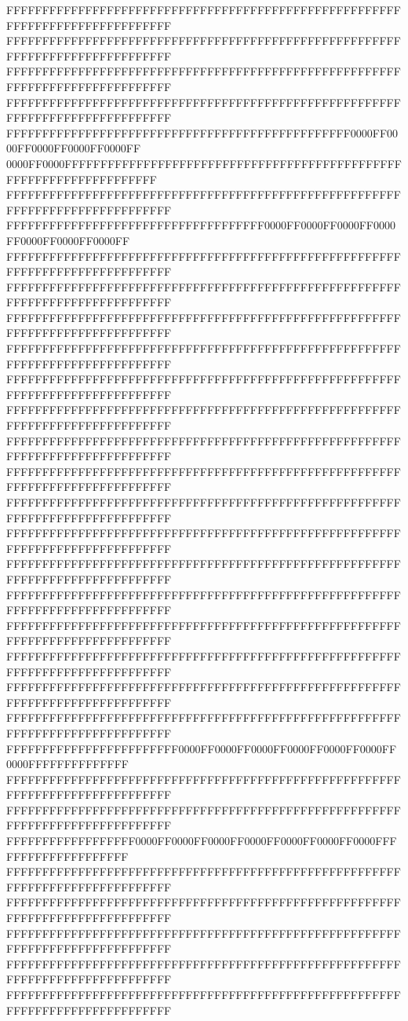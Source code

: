 FFFFFFFFFFFFFFFFFFFFFFFFFFFFFFFFFFFFFFFFFFFFFFFFFFFFFFFFFFFFFFFFFFFFFFFFFFFFFF
FFFFFFFFFFFFFFFFFFFFFFFFFFFFFFFFFFFFFFFFFFFFFFFFFFFFFFFFFFFFFFFFFFFFFFFFFFFFFF
FFFFFFFFFFFFFFFFFFFFFFFFFFFFFFFFFFFFFFFFFFFFFFFFFFFFFFFFFFFFFFFFFFFFFFFFFFFFFF
FFFFFFFFFFFFFFFFFFFFFFFFFFFFFFFFFFFFFFFFFFFFFFFFFFFFFFFFFFFFFFFFFFFFFFFFFFFFFF
FFFFFFFFFFFFFFFFFFFFFFFFFFFFFFFFFFFFFFFFFFFFFFFF0000FF0000FF0000FF0000FF0000FF
0000FF0000FFFFFFFFFFFFFFFFFFFFFFFFFFFFFFFFFFFFFFFFFFFFFFFFFFFFFFFFFFFFFFFFFFFF
FFFFFFFFFFFFFFFFFFFFFFFFFFFFFFFFFFFFFFFFFFFFFFFFFFFFFFFFFFFFFFFFFFFFFFFFFFFFFF
FFFFFFFFFFFFFFFFFFFFFFFFFFFFFFFFFFFF0000FF0000FF0000FF0000FF0000FF0000FF0000FF
FFFFFFFFFFFFFFFFFFFFFFFFFFFFFFFFFFFFFFFFFFFFFFFFFFFFFFFFFFFFFFFFFFFFFFFFFFFFFF
FFFFFFFFFFFFFFFFFFFFFFFFFFFFFFFFFFFFFFFFFFFFFFFFFFFFFFFFFFFFFFFFFFFFFFFFFFFFFF
FFFFFFFFFFFFFFFFFFFFFFFFFFFFFFFFFFFFFFFFFFFFFFFFFFFFFFFFFFFFFFFFFFFFFFFFFFFFFF
FFFFFFFFFFFFFFFFFFFFFFFFFFFFFFFFFFFFFFFFFFFFFFFFFFFFFFFFFFFFFFFFFFFFFFFFFFFFFF
FFFFFFFFFFFFFFFFFFFFFFFFFFFFFFFFFFFFFFFFFFFFFFFFFFFFFFFFFFFFFFFFFFFFFFFFFFFFFF
FFFFFFFFFFFFFFFFFFFFFFFFFFFFFFFFFFFFFFFFFFFFFFFFFFFFFFFFFFFFFFFFFFFFFFFFFFFFFF
FFFFFFFFFFFFFFFFFFFFFFFFFFFFFFFFFFFFFFFFFFFFFFFFFFFFFFFFFFFFFFFFFFFFFFFFFFFFFF
FFFFFFFFFFFFFFFFFFFFFFFFFFFFFFFFFFFFFFFFFFFFFFFFFFFFFFFFFFFFFFFFFFFFFFFFFFFFFF
FFFFFFFFFFFFFFFFFFFFFFFFFFFFFFFFFFFFFFFFFFFFFFFFFFFFFFFFFFFFFFFFFFFFFFFFFFFFFF
FFFFFFFFFFFFFFFFFFFFFFFFFFFFFFFFFFFFFFFFFFFFFFFFFFFFFFFFFFFFFFFFFFFFFFFFFFFFFF
FFFFFFFFFFFFFFFFFFFFFFFFFFFFFFFFFFFFFFFFFFFFFFFFFFFFFFFFFFFFFFFFFFFFFFFFFFFFFF
FFFFFFFFFFFFFFFFFFFFFFFFFFFFFFFFFFFFFFFFFFFFFFFFFFFFFFFFFFFFFFFFFFFFFFFFFFFFFF
FFFFFFFFFFFFFFFFFFFFFFFFFFFFFFFFFFFFFFFFFFFFFFFFFFFFFFFFFFFFFFFFFFFFFFFFFFFFFF
FFFFFFFFFFFFFFFFFFFFFFFFFFFFFFFFFFFFFFFFFFFFFFFFFFFFFFFFFFFFFFFFFFFFFFFFFFFFFF
FFFFFFFFFFFFFFFFFFFFFFFFFFFFFFFFFFFFFFFFFFFFFFFFFFFFFFFFFFFFFFFFFFFFFFFFFFFFFF
FFFFFFFFFFFFFFFFFFFFFFFFFFFFFFFFFFFFFFFFFFFFFFFFFFFFFFFFFFFFFFFFFFFFFFFFFFFFFF
FFFFFFFFFFFFFFFFFFFFFFFF0000FF0000FF0000FF0000FF0000FF0000FF0000FFFFFFFFFFFFFF
FFFFFFFFFFFFFFFFFFFFFFFFFFFFFFFFFFFFFFFFFFFFFFFFFFFFFFFFFFFFFFFFFFFFFFFFFFFFFF
FFFFFFFFFFFFFFFFFFFFFFFFFFFFFFFFFFFFFFFFFFFFFFFFFFFFFFFFFFFFFFFFFFFFFFFFFFFFFF
FFFFFFFFFFFFFFFFFF0000FF0000FF0000FF0000FF0000FF0000FF0000FFFFFFFFFFFFFFFFFFFF
FFFFFFFFFFFFFFFFFFFFFFFFFFFFFFFFFFFFFFFFFFFFFFFFFFFFFFFFFFFFFFFFFFFFFFFFFFFFFF
FFFFFFFFFFFFFFFFFFFFFFFFFFFFFFFFFFFFFFFFFFFFFFFFFFFFFFFFFFFFFFFFFFFFFFFFFFFFFF
FFFFFFFFFFFFFFFFFFFFFFFFFFFFFFFFFFFFFFFFFFFFFFFFFFFFFFFFFFFFFFFFFFFFFFFFFFFFFF
FFFFFFFFFFFFFFFFFFFFFFFFFFFFFFFFFFFFFFFFFFFFFFFFFFFFFFFFFFFFFFFFFFFFFFFFFFFFFF
FFFFFFFFFFFFFFFFFFFFFFFFFFFFFFFFFFFFFFFFFFFFFFFFFFFFFFFFFFFFFFFFFFFFFFFFFFFFFF
